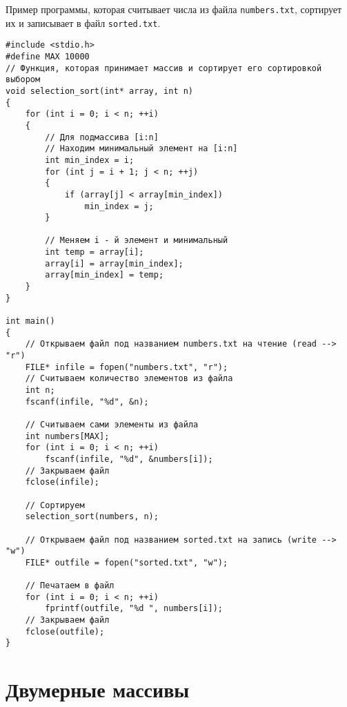 \documentclass{article}
\begin{document}
\newpage
Пример программы, которая считывает числа из файла \texttt{numbers.txt}, сортирует их и записывает в файл \texttt{sorted.txt}.

\begin{lstlisting}
#include <stdio.h>
#define MAX 10000
// Функция, которая принимает массив и сортирует его сортировкой выбором
void selection_sort(int* array, int n)
{
	for (int i = 0; i < n; ++i)
	{
		// Для подмассива [i:n]
		// Находим минимальный элемент на [i:n]
		int min_index = i;
		for (int j = i + 1; j < n; ++j)
		{
			if (array[j] < array[min_index])
				min_index = j;
		}
		
		// Меняем i - й элемент и минимальный
		int temp = array[i];
		array[i] = array[min_index];
		array[min_index] = temp;
	}
}

int main()
{
	// Открываем файл под названием numbers.txt на чтение (read --> "r")
	FILE* infile = fopen("numbers.txt", "r");
	// Считываем количество элементов из файла
	int n;
	fscanf(infile, "%d", &n);

	// Считываем сами элементы из файла
	int numbers[MAX];
	for (int i = 0; i < n; ++i)
		fscanf(infile, "%d", &numbers[i]);
	// Закрываем файл
	fclose(infile);

	// Сортируем
	selection_sort(numbers, n);

	// Открываем файл под названием sorted.txt на запись (write --> "w")
	FILE* outfile = fopen("sorted.txt", "w");

	// Печатаем в файл
	for (int i = 0; i < n; ++i)
		fprintf(outfile, "%d ", numbers[i]);
	// Закрываем файл
	fclose(outfile);
}
\end{lstlisting}
\newpage
\section*{Двумерные массивы}
\end{document}
